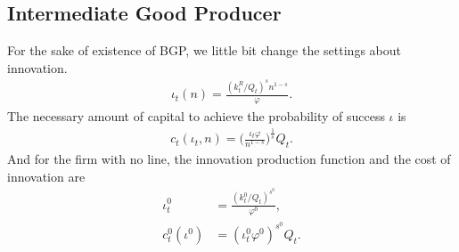 \documentclass[a4paper,12pt]{article}
\begin{document}
\begin{comment}
\begin{align}
    p_{i,t} = (r+\delta)\Big(\frac{q_{i,t}}{q_{i,t}^{2nd}}\Big)^\alpha = (1+\sigma)^\alpha(r+\delta).
\end{align}
Note that the price is also independent of the level of the quality. The amount of intermediate goods produced and the profit are
\begin{align}
    y_{i,t} = \frac{\alpha Y_t}{(1+\sigma)^\alpha(r_t+\delta)},\\
    \pi_{i,t} = \frac{(1+\sigma)^\alpha-1}{(1+\sigma)^\alpha}\alpha Y_t .
\end{align}
\subsubsection{Innovation}
Next we see the innovation decision. In each period, firms invest in R\&D and obtain new patents with the quality improved by the innovation step size $\sigma$ if they are successful. The product line obtained is determined randomly in from the product space except for the lines which are already operated by the firm. As an investment in R\&D, only capital is used as well as production and the production function of the innovation for the firm with $n$ operating product lines is
\end{comment}

\subsection{Intermediate Good Producer}
For the sake of existence of BGP, we little bit change the settings about innovation.
\begin{align}
    \iota_t(n) = \frac{(k_t^R/Q_t)^sn^{1-s}}{\varphi}.
\end{align}
The necessary amount of capital to achieve the probability of success $\iota$ is
\begin{align}
    c_t(\iota_t, n) = \Big(\frac{\iota_t\varphi}{n^{1-s}}\Big)^\frac{1}{s} Q_t.
\end{align}
And for the firm with no line, the innovation production function and the cost of innovation are
\begin{align}
    \iota_t^0  &= \frac{(k_t^0/Q_t)^{s^0}}{\varphi^0},\\
    c^0_t(\iota^0) &= (\iota_t^0\varphi^0)^{s^0} Q_t.
\end{align}
\end{document}
